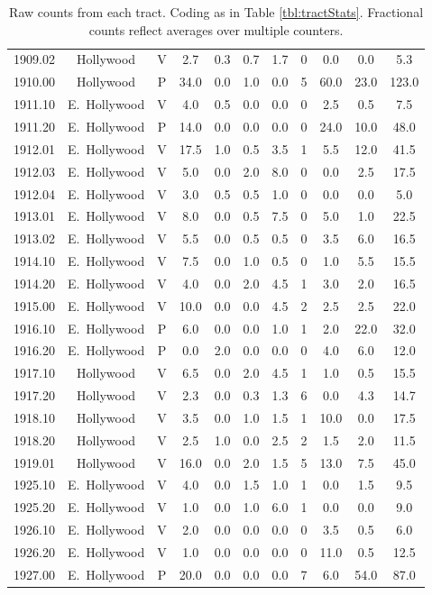 \documentclass[11pt,twocolumn]{article}
\begin{document}
\begin{table}[]
\begin{tabular}{ccccccccccc}
1909.02 & Hollywood & V &  2.7 &  0.3 &  0.7 &  1.7 & 0 &  0.0 &  0.0 &   5.3 \\
1910.00 & Hollywood & P & 34.0 &  0.0 &  1.0 &  0.0 & 5 & 60.0 & 23.0 & 123.0 \\
1911.10 & E.~Hollywood & V &  4.0 &  0.5 &  0.0 &  0.0 & 0 &  2.5 &  0.5 &   7.5 \\
1911.20 & E.~Hollywood & P & 14.0 &  0.0 &  0.0 &  0.0 & 0 & 24.0 & 10.0 &  48.0 \\
1912.01 & E.~Hollywood & V & 17.5 &  1.0 &  0.5 &  3.5 & 1 &  5.5 & 12.0 &  41.5 \\
1912.03 & E.~Hollywood & V &  5.0 &  0.0 &  2.0 &  8.0 & 0 &  0.0 &  2.5 &  17.5 \\
1912.04 & E.~Hollywood & V &  3.0 &  0.5 &  0.5 &  1.0 & 0 &  0.0 &  0.0 &   5.0 \\
1913.01 & E.~Hollywood & V &  8.0 &  0.0 &  0.5 &  7.5 & 0 &  5.0 &  1.0 &  22.5 \\
1913.02 & E.~Hollywood & V &  5.5 &  0.0 &  0.5 &  0.5 & 0 &  3.5 &  6.0 &  16.5 \\
1914.10 & E.~Hollywood & V &  7.5 &  0.0 &  1.0 &  0.5 & 0 &  1.0 &  5.5 &  15.5 \\
1914.20 & E.~Hollywood & V &  4.0 &  0.0 &  2.0 &  4.5 & 1 &  3.0 &  2.0 &  16.5 \\
1915.00 & E.~Hollywood & V & 10.0 &  0.0 &  0.0 &  4.5 & 2 &  2.5 &  2.5 &  22.0 \\
1916.10 & E.~Hollywood & P &  6.0 &  0.0 &  0.0 &  1.0 & 1 &  2.0 & 22.0 &  32.0 \\
1916.20 & E.~Hollywood & P &  0.0 &  2.0 &  0.0 &  0.0 & 0 &  4.0 &  6.0 &  12.0 \\
1917.10 & Hollywood & V &  6.5 &  0.0 &  2.0 &  4.5 & 1 &  1.0 &  0.5 &  15.5 \\
1917.20 & Hollywood & V &  2.3 &  0.0 &  0.3 &  1.3 & 6 &  0.0 &  4.3 &  14.7 \\
1918.10 & Hollywood & V &  3.5 &  0.0 &  1.0 &  1.5 & 1 & 10.0 &  0.0 &  17.5 \\
1918.20 & Hollywood & V &  2.5 &  1.0 &  0.0 &  2.5 & 2 &  1.5 &  2.0 &  11.5 \\
1919.01 & Hollywood & V & 16.0 &  0.0 &  2.0 &  1.5 & 5 & 13.0 &  7.5 &  45.0 \\
1925.10 & E.~Hollywood & V &  4.0 &  0.0 &  1.5 &  1.0 & 1 &  0.0 &  1.5 &   9.5 \\
1925.20 & E.~Hollywood & V &  1.0 &  0.0 &  1.0 &  6.0 & 1 &  0.0 &  0.0 &   9.0 \\
1926.10 & E.~Hollywood & V &  2.0 &  0.0 &  0.0 &  0.0 & 0 &  3.5 &  0.5 &   6.0 \\
1926.20 & E.~Hollywood & V &  1.0 &  0.0 &  0.0 &  0.0 & 0 & 11.0 &  0.5 &  12.5 \\
1927.00 & E.~Hollywood & P & 20.0 &  0.0 &  0.0 &  0.0 & 7 &  6.0 & 54.0 &  87.0 \\
\bottomrule
\end{tabular}
\caption*{Raw counts from each tract. Coding as in Table \ref{tbl:tractStats}. Fractional counts
reflect averages over multiple counters.}
\label{tbl:allCount}
\end{table}
\end{document}
